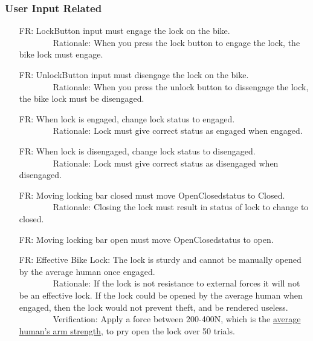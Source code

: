 \documentclass[12pt]{article}
\newcounter{reqnum} %
\begin{document}
\subsubsection{User Input Related}
\begin{itemize}
\setlength{\itemindent}{.5in}
\item[FR\refstepcounter{reqnum}\thereqnum\label{FR1}:] LockButton input must engage the lock on the bike.
\\ \-\ \-\ \-\ \-\ \-\ \-\ \-\ \-\ Rationale: When you press the lock button to engage the lock, the bike lock must engage.
\item[FR\refstepcounter{reqnum}\thereqnum\label{FR2}:] UnlockButton input must disengage the lock on the bike.
\\ \-\ \-\ \-\ \-\ \-\ \-\ \-\ \-\ Rationale: When you press the unlock button to dissengage the lock, the bike lock must be disengaged.
\item[FR\refstepcounter{reqnum}\thereqnum\label{FR3}:] When lock is engaged, change lock status to engaged.
\\ \-\ \-\ \-\ \-\ \-\ \-\ \-\ \-\ Rationale: Lock must give correct status as engaged when engaged.
\item[FR\refstepcounter{reqnum}\thereqnum\label{FR4}:] When lock is disengaged, change lock status to disengaged.
\\ \-\ \-\ \-\ \-\ \-\ \-\ \-\ \-\ Rationale: Lock must give correct status as disengaged when disengaged.
\item[FR\refstepcounter{reqnum}\thereqnum\label{FR5}:] Moving locking bar closed must move OpenClosedstatus to Closed.
\\ \-\ \-\ \-\ \-\ \-\ \-\ \-\ \-\ Rationale: Closing the lock must result in status of lock to change to closed.
\item[FR\refstepcounter{reqnum}\thereqnum\label{FR6}:] Moving locking bar open must move OpenClosedstatus to open.
\item[FR\refstepcounter{reqnum}\thereqnum\label{FR7}:] Effective Bike Lock: The lock is sturdy and cannot be manually opened by the average human once engaged.
\\ \-\ \-\ \-\ \-\ \-\ \-\ \-\ \-\ Rationale: If the lock is not resistance to external forces it will not be an effective lock. If the lock could be opened by the average human when engaged, then the lock would not prevent theft, and be rendered useless.
\\ \-\ \-\ \-\ \-\ \-\ \-\ \-\ \-\ Verification: Apply a force between 200-400N, which is the \href{https://www.tandfonline.com/doi/pdf/10.1080/10803548.2004.11076594?cookieSet=1}{average human's arm strength}, to pry open the lock over 50 trials. 

\end{itemize}
\end{document}
